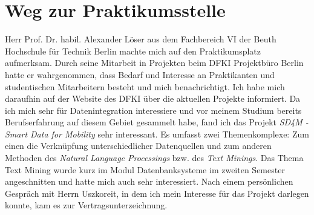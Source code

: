 \section{Weg zur Praktikumsstelle}
\label{sec:intro:wegZurPraktikumsstelle}
Herr Prof. Dr. habil. Alexander Löser aus dem Fachbereich VI der Beuth Hochschule für Technik Berlin machte mich auf den Praktikumsplatz aufmerksam. Durch seine Mitarbeit in Projekten beim DFKI Projektbüro Berlin hatte er wahrgenommen, dass Bedarf und Interesse an Praktikanten und studentischen Mitarbeitern besteht und mich benachrichtigt.
Ich habe mich daraufhin auf der Website des DFKI über die aktuellen Projekte informiert.
Da ich mich sehr für Datenintegration interessiere und vor meinem Studium bereits Berufserfahrung auf diesem Gebiet gesammelt habe, fand ich das Projekt \textit{SD4M - Smart Data for Mobility} sehr interessant.
Es umfasst zwei Themenkomplexe: Zum einen die Verknüpfung unterschiedlicher Datenquellen und zum anderen Methoden des \textit{Natural Language Processings} bzw. des \textit{Text Minings}.
Das Thema Text Mining wurde kurz im Modul Datenbanksysteme im zweiten Semester angeschnitten und hatte mich auch sehr interessiert.
Nach einem persönlichen Gespräch mit Herrn Uszkoreit, in dem ich mein Interesse für das Projekt darlegen konnte, kam es zur Vertragsunterzeichnung.